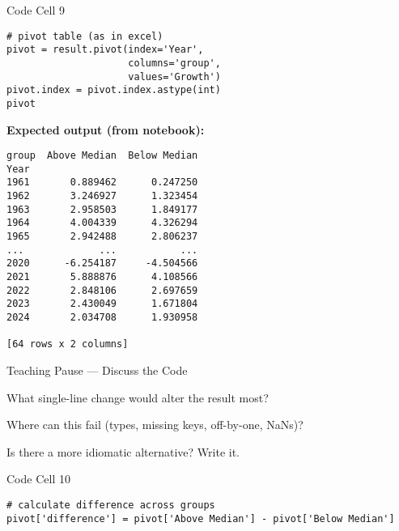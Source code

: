 \documentclass[notes,11pt, aspectratio=169, xcolor=table]{beamer}
\newenvironment{wideitemize}{\itemize\addtolength{\itemsep}{10pt}}{\enditemize}
\begin{document}
\begin{frame}[fragile]{Code Cell 9}
\begin{verbatim}
# pivot table (as in excel)
pivot = result.pivot(index='Year',
                     columns='group',
                     values='Growth')
pivot.index = pivot.index.astype(int)
pivot
\end{verbatim}
\vspace{0.5ex}
\textbf{Expected output (from notebook):}
\begin{verbatim}
group  Above Median  Below Median
Year                             
1961       0.889462      0.247250
1962       3.246927      1.323454
1963       2.958503      1.849177
1964       4.004339      4.326294
1965       2.942488      2.806237
...             ...           ...
2020      -6.254187     -4.504566
2021       5.888876      4.108566
2022       2.848106      2.697659
2023       2.430049      1.671804
2024       2.034708      1.930958

[64 rows x 2 columns]
\end{verbatim}
\end{frame}

\begin{frame}{Teaching Pause — Discuss the Code}
\begin{wideitemize}
\item What single-line change would alter the result most?
\item Where can this fail (types, missing keys, off-by-one, NaNs)?
\item Is there a more idiomatic alternative? Write it.
\end{wideitemize}
\end{frame}

\begin{frame}[fragile]{Code Cell 10}
\begin{verbatim}
# calculate difference across groups
pivot['difference'] = pivot['Above Median'] - pivot['Below Median']
\end{verbatim}

\end{frame}
\end{document}

